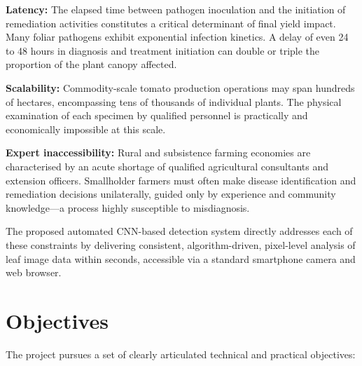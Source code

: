 \documentclass[12pt,a4paper]{report}
\begin{document}
\textbf{Latency:} The elapsed time between pathogen inoculation and the initiation of remediation activities constitutes a critical determinant of final yield impact. Many foliar pathogens exhibit exponential infection kinetics. A delay of even 24 to 48 hours in diagnosis and treatment initiation can double or triple the proportion of the plant canopy affected.

\textbf{Scalability:} Commodity-scale tomato production operations may span hundreds of hectares, encompassing tens of thousands of individual plants. The physical examination of each specimen by qualified personnel is practically and economically impossible at this scale.

\textbf{Expert inaccessibility:} Rural and subsistence farming economies are characterised by an acute shortage of qualified agricultural consultants and extension officers. Smallholder farmers must often make disease identification and remediation decisions unilaterally, guided only by experience and community knowledge---a process highly susceptible to misdiagnosis.

The proposed automated CNN-based detection system directly addresses each of these constraints by delivering consistent, algorithm-driven, pixel-level analysis of leaf image data within seconds, accessible via a standard smartphone camera and web browser.

\section{Objectives}

The project pursues a set of clearly articulated technical and practical objectives:
\end{document}
